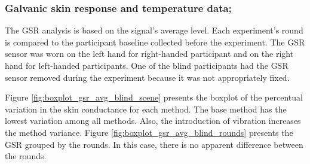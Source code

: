 \subsubsection{Galvanic skin response and temperature data;}
\label{subsubsec:results_gsr_temp_1}

The GSR analysis is based on the signal's average level. Each experiment's round is compared to the participant baseline collected before the experiment. The GSR sensor was worn on the left hand for right-handed participant and on the right hand for left-handed participants. One of the blind participants had the GSR sensor removed during the experiment because it was not appropriately fixed.

Figure \ref{fig:boxplot_gsr_avg_blind_scene} presents the boxplot of the percentual variation in the skin conductance for each method. The base method has the lowest variation among all methods. Also, the introduction of vibration increases the method variance. Figure \ref{fig:boxplot_gsr_avg_blind_rounds} presents the GSR grouped by the rounds. In this case, there is no apparent difference between the rounds.

